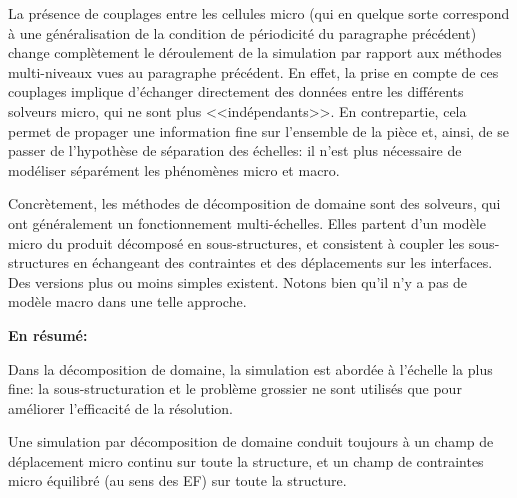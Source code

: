 \medskip
La présence de couplages entre les cellules micro 
(qui en quelque sorte correspond à une généralisation de la condition de périodicité 
du paragraphe précédent) change complètement le déroulement de la simulation par 
rapport aux méthodes  multi-niveaux vues au paragraphe précédent. 
En effet, la prise en compte de ces couplages implique d'échanger directement des données 
entre les différents solveurs micro, qui ne sont plus <<indépendants>>. 
En contrepartie, cela permet de propager une information fine sur l'ensemble de la pièce et, 
ainsi, de se passer de l'hypothèse de séparation des échelles: il n'est plus nécessaire de 
modéliser séparément les phénomènes micro et macro.

\medskip
Concrètement, les méthodes de décomposition de domaine 
sont des solveurs, qui ont généralement un fonctionnement multi-échelles. 
Elles partent d'un modèle micro du produit
décomposé en sous-structures, et consistent à coupler les sous-structures en échangeant des
contraintes et des déplacements sur les interfaces.
Des versions plus ou moins simples existent. Notons bien qu'il n'y a pas de modèle macro
dans une telle approche.

\medskip{}
\textbf{En résumé:}

Dans la décomposition de domaine, la simulation est abordée 
à l'échelle la plus fine: la sous-structuration et le problème grossier ne sont utilisés que pour 
améliorer l'efficacité de la résolution.

Une simulation par décomposition de domaine conduit toujours 
à un champ de déplacement micro continu sur toute la structure, et un champ de contraintes micro
équilibré (au sens des EF) sur toute la structure.

\medskip
{}

